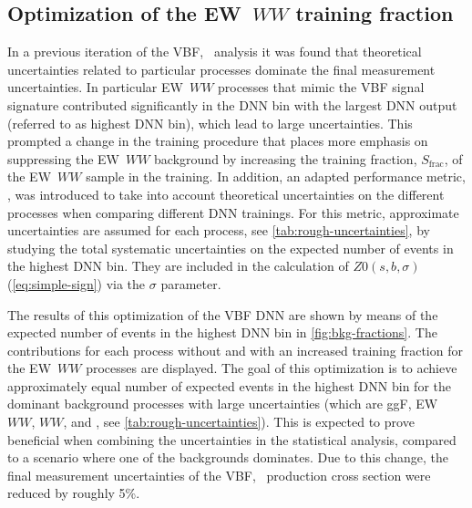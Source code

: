 \subsection{Optimization of the EW~$WW$ training fraction}
\label{app:sec:ewww-sample-fraction-optimization}
In a previous iteration of the VBF, \HWW\ analysis it was found that theoretical uncertainties related to particular processes dominate the final measurement uncertainties. In particular EW~$WW$ processes that mimic the VBF signal signature contributed significantly in the DNN bin with the largest DNN output (referred to as highest DNN bin), which lead to large uncertainties.
This prompted a change in the training procedure that places more emphasis on suppressing the EW~$WW$ background by increasing the training fraction, $S_\mathrm{frac}$, of the EW~$WW$ sample in the training.
In addition, an adapted performance metric, \ZVBFunc, was introduced to take into account theoretical uncertainties on the different processes when comparing different DNN trainings.
For this metric, approximate uncertainties are assumed for each process, see \cref{tab:rough-uncertainties}, by studying the total systematic uncertainties on the expected number of events in the highest DNN bin. They are included in the calculation of $Z0(s, b, \sigma)$ (\cref{eq:simple-sign}) via the $\sigma$ parameter.

The results of this optimization of the VBF DNN are shown by means of the expected number of events in the highest DNN bin in \cref{fig:bkg-fractions}. The contributions for each process without and with an increased training fraction for the EW~$WW$ processes are displayed.
The goal of this optimization is to achieve approximately equal number of expected events in the highest DNN bin for the dominant background processes with large uncertainties (which are ggF, EW~$WW$, $WW$, and \ttbar, see \cref{tab:rough-uncertainties}).
This is expected to prove beneficial when combining the uncertainties in the statistical analysis, compared to a scenario where one of the backgrounds dominates.
Due to this change, the final measurement uncertainties of the VBF, \HWW\ production cross section were reduced by roughly 5\%. 

